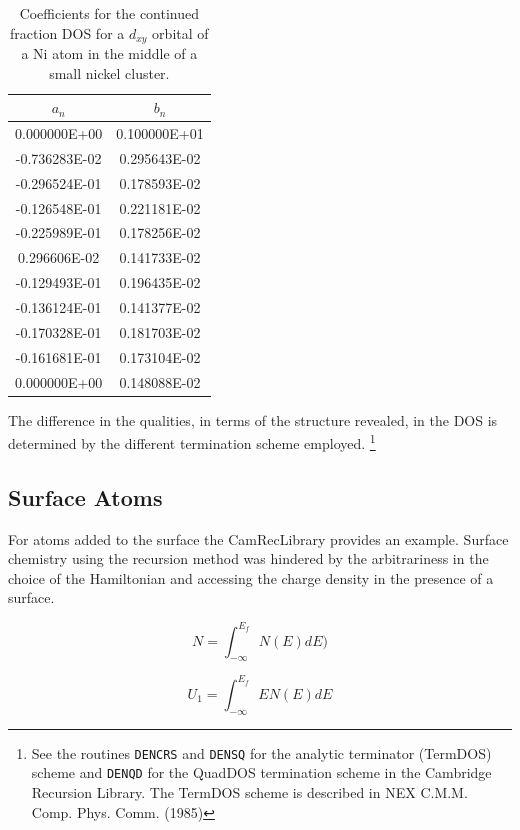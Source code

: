 \begin{table}
\begin{center}
\begin{tabular}{|c|c|}
\hline
$a_{n}$ & $b_{n}$ \\
\hline
 0.000000E+00 & 0.100000E+01\\
-0.736283E-02 & 0.295643E-02\\
-0.296524E-01 & 0.178593E-02\\
-0.126548E-01 & 0.221181E-02\\
-0.225989E-01 & 0.178256E-02\\
 0.296606E-02 & 0.141733E-02\\
-0.129493E-01 & 0.196435E-02\\
-0.136124E-01 & 0.141377E-02\\
-0.170328E-01 & 0.181703E-02\\
-0.161681E-01 & 0.173104E-02\\
 0.000000E+00 & 0.148088E-02\\
\hline
\end{tabular}
\caption{Coefficients for the continued fraction DOS for a $d_{xy}$ orbital of a Ni 
atom in the middle of a small nickel cluster.}
\end{center}
\end{table}

The difference in the qualities, in terms of the structure revealed, in the DOS 
is determined by the different termination scheme employed. \footnote{See the routines 
\texttt{DENCRS} and \texttt{DENSQ} for the analytic terminator (TermDOS) scheme and \texttt{DENQD} 
for the QuadDOS termination scheme in the Cambridge Recursion Library. 
The TermDOS scheme is described in NEX C.M.M. Comp. Phys. Comm.  (1985)}

\subsection{Surface Atoms}
For atoms added to the surface the CamRecLibrary provides an example. 
Surface chemistry using the recursion method was hindered 
by the arbitrariness in the choice of the Hamiltonian and accessing the 
charge density in the presence of a surface. 


\begin{equation}
N = \int_{-\infty}^{E_{f}}N(E) dE)
\end{equation}

\begin{equation}
U_{1} = \int_{-\infty}^{E_{f}}EN(E)dE
\end{equation}

